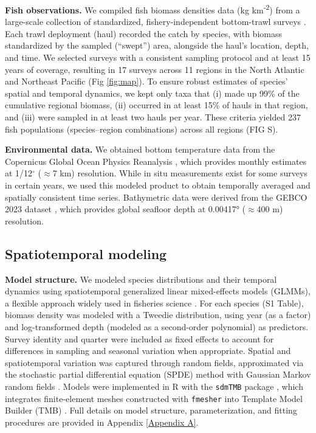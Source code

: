 \documentclass[lineno,pdflatex,sn-nature]{sn-jnl}%
\theoremstyle{thmstyleone}%
\theoremstyle{thmstyletwo}%
\theoremstyle{thmstylethree}%
\begin{document}
\textbf{Fish observations.} We compiled fish biomass densities data (kg km\textsuperscript{-2}) from 
a large-scale collection of standardized, fishery-independent bottom-trawl surveys \citep{maureaud_fishglob_data_2024}. Each trawl deployment (haul) recorded the catch by species, with biomass standardized by the sampled (``swept'') area, alongside the haul’s location, depth, and time. We selected surveys with a consistent sampling protocol and at least 15 years of coverage, resulting in 17 surveys across 11 regions in the North Atlantic and Northeast Pacific (Fig \ref{fig:map}).
To ensure robust estimates of species’ spatial and temporal dynamics, we kept only taxa that (i) made up 99\% of the cumulative regional biomass, (ii) occurred in at least 15\% of hauls in that region, and (iii) were sampled in at least two hauls per year. These criteria yielded 237 fish populations (species–region combinations) across all regions (FIG S).

\textbf{Environmental data.} We obtained bottom temperature data from the Copernicus Global Ocean Physics Reanalysis \citep{european_union-copernicus_marine_service_global_2018}, which provides monthly estimates at 1/12$^{\circ}$ ($\approx$7 km) resolution. While in situ measurements exist for some surveys in certain years, we used this modeled product to obtain temporally averaged and spatially consistent time series. Bathymetric data were derived from the GEBCO 2023 dataset \citep{gebco_bathymetric_compilation_group_2023_gebco_2023_2023}, which provides global seafloor depth at 0.00417° ($\approx$400 m) resolution.



\subsection{Spatiotemporal modeling}\label{sec:Species spatiotemporal modeling}

\textbf{Model structure.} We modeled species distributions and their temporal dynamics using spatiotemporal generalized linear mixed-effects models (GLMMs), a flexible approach widely used in fisheries science \citep{thorson_geostatistical_2015, thorson_model-based_2016}. For each species (S1 Table), biomass density was modeled with a Tweedie distribution, using year (as a factor) and log-transformed depth (modeled as a second-order polynomial) as predictors. Survey identity and quarter were included as fixed effects to account for differences in sampling and seasonal variation when appropriate. Spatial and spatiotemporal variation was captured through random fields, approximated via the stochastic partial differential equation (SPDE) method with Gaussian Markov random fields \citep{lindgren_explicit_2011}. Models were implemented in R with the \texttt{sdmTMB} package \citep{anderson_sdmtmb_2024}, which integrates finite-element meshes constructed with \texttt{fmesher} \citep{lindgren_fmesher_2025} into Template Model Builder (TMB) \citep{kristensen_tmb_2016}. Full details on model structure, parameterization, and fitting procedures are provided in Appendix \ref{Appendix A}.
\end{document}
